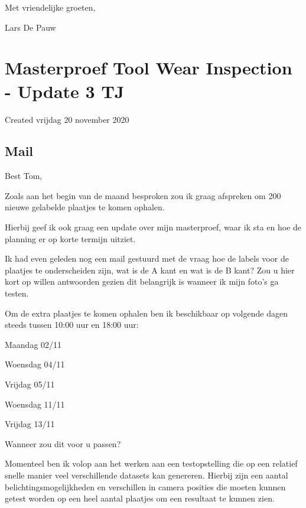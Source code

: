 \documentclass{article}
\begin{document}
 

Met vriendelijke groeten,

 

Lars De Pauw






		\section{Masterproef Tool Wear Inspection - Update 3 TJ}

Created vrijdag 20 november 2020



\subsection{Mail}



Best Tom,

 

Zoals aan het begin van de maand besproken zou ik graag afspreken om 200 nieuwe gelabelde plaatjes te komen ophalen.

Hierbij geef ik ook graag een update over mijn masterproef, waar ik sta en hoe de planning er op korte termijn uitziet.

 

Ik had even geleden nog een mail gestuurd met de vraag hoe de labels voor de plaatjes te onderscheiden zijn, wat is de A kant en wat is de B kant? Zou u hier kort op willen antwoorden gezien dit belangrijk is wanneer ik mijn foto’s ga testen.

 

Om de extra plaatjes te komen ophalen ben ik beschikbaar op volgende dagen steeds tussen 10:00 uur en 18:00 uur:

Maandag 02/11

Woensdag 04/11

Vrijdag 05/11

Woensdag 11/11

Vrijdag 13/11

 

Wanneer zou dit voor u passen?

 

Momenteel ben ik volop aan het werken aan een testopstelling die op een relatief snelle manier veel verschillende datasets kan genereren. Hierbij zijn een aantal belichtingsmogelijkheden en verschillen in camera posities die moeten kunnen getest worden op een heel aantal plaatjes om een resultaat te kunnen zien.
\end{document}
